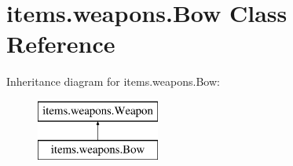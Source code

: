 \hypertarget{classitems_1_1weapons_1_1_bow}{}\section{items.\+weapons.\+Bow Class Reference}
\label{classitems_1_1weapons_1_1_bow}
Inheritance diagram for items.\+weapons.\+Bow\+:\begin{figure}[H]
\begin{center}
\leavevmode
\includegraphics[height=2.000000cm]{classitems_1_1weapons_1_1_bow}
\end{center}
\end{figure}
